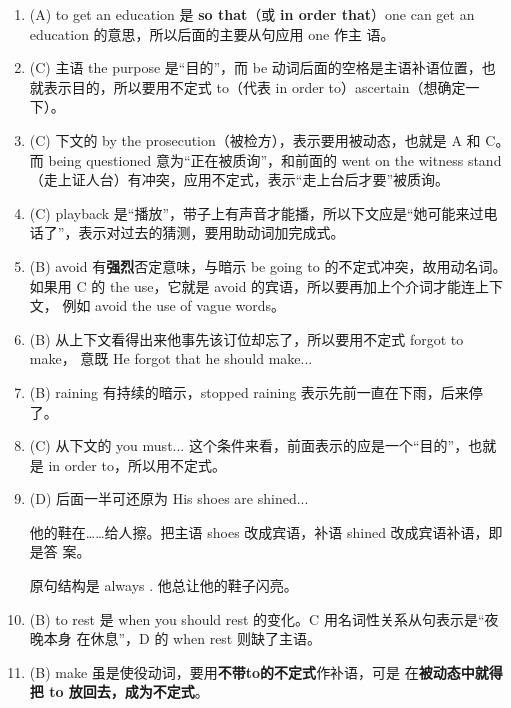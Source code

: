 \begin{enumerate}
\item (A) to get an education 是 \textbf{so that}（或 \textbf{in order
    that}）one can get an education 的意思，所以后面的主要从句应用 one 作主
  语。

\item (C) 主语 the purpose 是“目的”，而 be 动词后面的空格是主语补语位置，也
  就表示目的，所以要用不定式 to（代表 in order to）ascertain（想确定一下）。

\item (C) 下文的 by the prosecution（被检方），表示要用被动态，也就是 A 和 C。
  而 being questioned 意为“正在被质询”，和前面的 went on the witness
  stand（走上证人台）有冲突，应用不定式，表示“走上台后才要”被质询。

\item (C) playback 是“播放”，带子上有声音才能播，所以下文应是“她可能来过电
  话了”，表示对过去的猜测，要用助动词加完成式。

\item (B) avoid 有\textbf{强烈}否定意味，与暗示 be going to 的不定式冲突，故用动名词。
  如果用 C 的 the use，它就是 avoid 的宾语，所以要再加上个介词才能连上下文，
  例如 avoid the use of vague words。


\item (B) 从上下文看得出来他事先该订位却忘了，所以要用不定式 forgot to make，
  意既 He forgot that he should make...

\item (B) raining 有持续的暗示，stopped raining 表示先前一直在下雨，后来停了。

\item (C) 从下文的 you must... 这个条件来看，前面表示的应是一个“目的”，也就
  是 in order to，所以用不定式。

\item (D) 后面一半可还原为 His shoes are shined...

  他的鞋在……给人擦。把主语 shoes 改成宾语，补语 shined 改成宾语补语，即是答
  案。

  原句结构是  always  
  . 他总让他的鞋子闪亮。

\item (B) to rest 是 when you should rest 的变化。C 用名词性关系从句表示是“夜晚本身
  在休息”，D 的 when rest 则缺了主语。

\item (B) make 虽是使役动词，要用\textbf{不带to的不定式}作补语，可是
  在\textbf{被动态中就得把 to 放回去，成为不定式}。

\end{enumerate}



